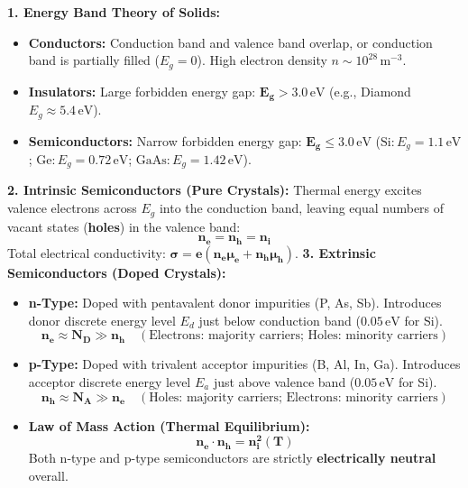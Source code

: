 \documentclass[10pt,twoside,openright]{book}
\begin{document}
\begin{conceptbox}
\textbf{1. Energy Band Theory of Solids:}
\begin{itemize}
  \item \textbf{Conductors:} Conduction band and valence band overlap, or conduction band is partially filled ($E_g = 0$). High electron density $n \sim 10^{28}\,\mathrm{m}^{-3}$.
  \item \textbf{Insulators:} Large forbidden energy gap: $\mathbf{E_g > 3.0\,\mathrm{eV}}$ (e.g., Diamond $E_g \approx 5.4\,\mathrm{eV}$).
  \item \textbf{Semiconductors:} Narrow forbidden energy gap: $\mathbf{E_g \le 3.0\,\mathrm{eV}}$ ($\mathrm{Si}: E_g = 1.1\,\mathrm{eV}$; $\mathrm{Ge}: E_g = 0.72\,\mathrm{eV}$; $\mathrm{GaAs}: E_g = 1.42\,\mathrm{eV}$).
\end{itemize}
\textbf{2. Intrinsic Semiconductors (Pure Crystals):}
Thermal energy excites valence electrons across $E_g$ into the conduction band, leaving equal numbers of vacant states (\textbf{holes}) in the valence band:
\begin{equation}
  \mathbf{n_e = n_h = n_i}
\end{equation}
Total electrical conductivity: $\mathbf{\sigma = e(n_e \mu_e + n_h \mu_h)}$.
\textbf{3. Extrinsic Semiconductors (Doped Crystals):}
\begin{itemize}
  \item \textbf{n-Type:} Doped with pentavalent donor impurities (P, As, Sb). Introduces donor discrete energy level $E_d$ just below conduction band ($0.05\,\mathrm{eV}$ for Si).
  \begin{equation}
    \mathbf{n_e \approx N_D \gg n_h} \quad (\text{Electrons: majority carriers; Holes: minority carriers})
  \end{equation}
  \item \textbf{p-Type:} Doped with trivalent acceptor impurities (B, Al, In, Ga). Introduces acceptor discrete energy level $E_a$ just above valence band ($0.05\,\mathrm{eV}$ for Si).
  \begin{equation}
    \mathbf{n_h \approx N_A \gg n_e} \quad (\text{Holes: majority carriers; Electrons: minority carriers})
  \end{equation}
  \item \textbf{Law of Mass Action (Thermal Equilibrium):}
  \begin{equation}
    \mathbf{n_e \cdot n_h = n_i^2(T)}
  \end{equation}
  Both n-type and p-type semiconductors are strictly \textbf{electrically neutral} overall.
\end{itemize}
\end{conceptbox}
\end{document}
